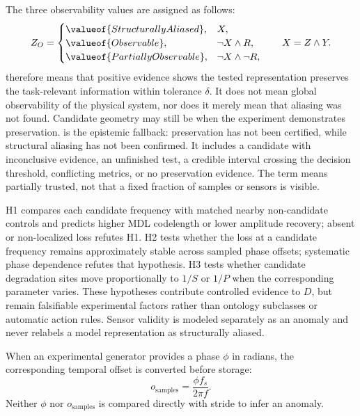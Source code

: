 The three observability values are assigned as follows:
\begin{equation}
Z_O=
\begin{cases}
\valueof{StructurallyAliased}, & X,\\
\valueof{Observable}, & \neg X\wedge R,\\
\valueof{PartiallyObservable}, & \neg X\wedge\neg R,
\end{cases}
\qquad X=Z\wedge Y.
\label{eq:observability-state}
\end{equation}
 therefore means that positive evidence shows the tested representation preserves the task-relevant information within tolerance $\delta$. It does not mean global observability of the physical system, nor does it merely mean that aliasing was not found. Candidate geometry may still be  when the experiment demonstrates preservation.  is the epistemic fallback: preservation has not been certified, while structural aliasing has not been confirmed. It includes a candidate with inconclusive evidence, an unfinished test, a credible interval crossing the decision threshold, conflicting metrics, or no preservation evidence. The term means partially trusted, not that a fixed fraction of samples or sensors is visible.

H1 compares each candidate frequency with matched nearby non-candidate controls and predicts higher MDL codelength or lower amplitude recovery; absent or non-localized loss refutes H1. H2 tests whether the loss at a candidate frequency remains approximately stable across sampled phase offsets; systematic phase dependence refutes that hypothesis. H3 tests whether candidate degradation sites move proportionally to $1/S$ or $1/P$ when the corresponding parameter varies. These hypotheses contribute controlled evidence to $D$, but remain falsifiable experimental factors rather than ontology subclasses or automatic action rules. Sensor validity is modeled separately as an anomaly and never relabels a model representation as structurally aliased.

When an experimental generator provides a phase $\phi$ in radians, the corresponding temporal offset is converted before storage:
\begin{equation}
o_{\mathrm{samples}}=\frac{\phi f_s}{2\pi f}.
\label{eq:phase-conversion}
\end{equation}
Neither $\phi$ nor $o_{\mathrm{samples}}$ is compared directly with stride to infer an anomaly.

